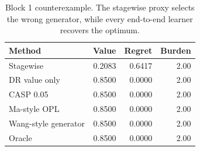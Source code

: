 \begin{table}[!htbp]
\centering
\small
\begin{tabular}{@{}lrrr@{}}
\toprule
Method & Value & Regret & Burden \\
\midrule
Stagewise & 0.2083 & 0.6417 & 2.00 \\
DR value only & 0.8500 & 0.0000 & 2.00 \\
CASP 0.05 & 0.8500 & 0.0000 & 2.00 \\
Ma-style OPL & 0.8500 & 0.0000 & 2.00 \\
Wang-style generator & 0.8500 & 0.0000 & 2.00 \\
Oracle & 0.8500 & 0.0000 & 2.00 \\
\bottomrule
\end{tabular}
\caption{Block 1 counterexample. The stagewise proxy selects the wrong generator, while every end-to-end learner recovers the optimum.}
\label{tab:block1-counterexample}
\end{table}
